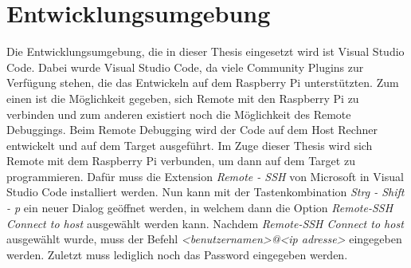 \section{Entwicklungsumgebung}
\label{sec:entwicklungsumgebung}
Die Entwicklungsumgebung, die in dieser Thesis eingesetzt wird ist Visual Studio Code. Dabei
wurde Visual Studio Code, da viele Community Plugins zur Verfügung stehen,
die das Entwickeln auf dem Raspberry Pi unterstützten. Zum einen ist die Möglichkeit gegeben, sich
Remote mit den Raspberry Pi zu verbinden und zum anderen
existiert noch die Möglichkeit des Remote Debuggings. Beim Remote Debugging wird der Code auf dem
Host Rechner entwickelt und auf dem Target ausgeführt.
\newline
\newline
Im Zuge dieser Thesis wird sich Remote mit dem Raspberry Pi verbunden, um dann auf dem Target zu
programmieren. Dafür muss die Extension \emph{Remote - SSH} von Microsoft in Visual Studio Code
installiert werden. Nun kann mit der Tastenkombination \emph{Strg - Shift - p} ein neuer Dialog
geöffnet werden, in welchem dann die Option \emph{Remote-SSH Connect to host} ausgewählt werden
kann. Nachdem \emph{Remote-SSH Connect to host} ausgewählt wurde, muss der Befehl
\emph{<benutzernamen>@<ip adresse>} eingegeben werden. Zuletzt muss lediglich noch das Password
eingegeben werden.